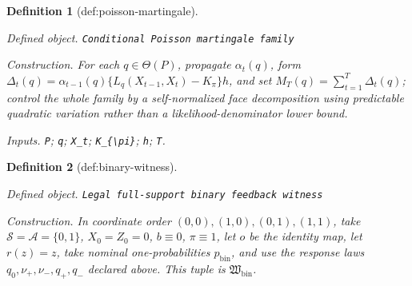 \documentclass{article}
\newtheorem{definition}{Definition}
\begin{document}
\begin{definition}[def:poisson-martingale]\label{def:poisson-martingale}
\par\smallskip\noindent\emph{Defined object.} \texttt{Conditional Poisson martingale family}
\par\smallskip\noindent\emph{Construction.} For each \(q\in\Theta(P)\), propagate \(\alpha_t(q)\), form \(\Delta_t(q)=\alpha_{t-1}(q)\{L_q(X_{t-1},X_t)-K_{\pi}\}h\), and set \(M_T(q)=\sum_{t=1}^T\Delta_t(q)\); control the whole family by a self-normalized face decomposition using predictable quadratic variation rather than a likelihood-denominator lower bound.
\par\smallskip\noindent\emph{Inputs.} \texttt{P}; \texttt{q}; \texttt{X\_\allowbreak{}t}; \texttt{K\_\allowbreak{}\{\textbackslash{}\allowbreak{}pi\}\allowbreak{}}; \texttt{h}; \texttt{T}.
\end{definition}

\begin{definition}[def:binary-witness]\label{def:binary-witness}
\par\smallskip\noindent\emph{Defined object.} \texttt{Legal full-\allowbreak{}support binary feedback witness}
\par\smallskip\noindent\emph{Construction.} In coordinate order \((0,0),(1,0),(0,1),(1,1)\), take \(\mathcal S=\mathcal A=\{0,1\}\), \(X_0=Z_0=0\), \(b\equiv0\), \(\pi\equiv1\), let \(o\) be the identity map, let \(r(z)=z\), take nominal one-probabilities \(p_{\mathrm{bin}}\), and use the response laws \(q_0,\nu_+,\nu_-,q_+,q_-\) declared above. This tuple is \(\mathfrak W_{\mathrm{bin}}\).
\end{definition}
\end{document}
